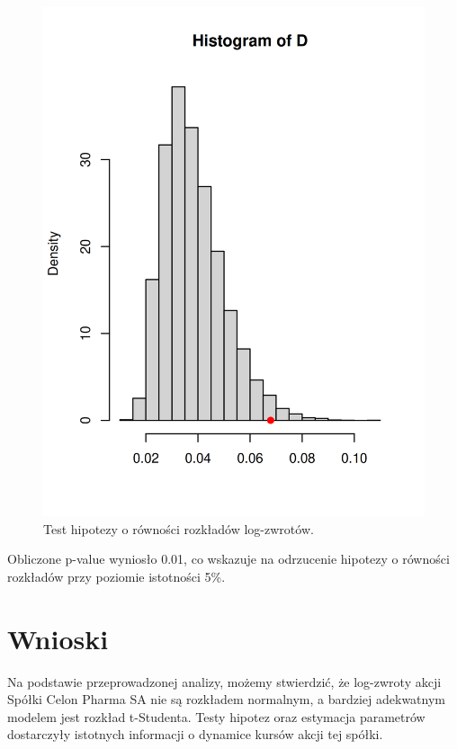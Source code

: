 \documentclass[a4paper,12pt]{article}
\begin{document}
\begin{figure}[h!]
\centering
\includegraphics[width=\textwidth]{img/hipoteza_o_rownosci_cln.png}
\caption{Test hipotezy o równości rozkładów log-zwrotów.}
\end{figure}

Obliczone p-value wyniosło 0.01, co wskazuje na odrzucenie hipotezy o równości rozkładów przy poziomie istotności 5\%.

\section{Wnioski}
Na podstawie przeprowadzonej analizy, możemy stwierdzić, że log-zwroty akcji Spółki Celon Pharma SA nie są rozkładem normalnym, a bardziej adekwatnym modelem jest rozkład t-Studenta. Testy hipotez oraz estymacja parametrów dostarczyły istotnych informacji o dynamice kursów akcji tej spółki.
\end{document}
